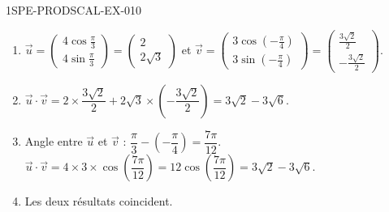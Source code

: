 \begin{corrige}{1SPE-PRODSCAL-EX-010}
\begin{enumerate}
\item $\vec{u} = \begin{pmatrix} 4\cos\frac{\pi}{3} \\ 4\sin\frac{\pi}{3} \end{pmatrix} = \begin{pmatrix} 2 \\ 2\sqrt{3} \end{pmatrix}$ et $\vec{v} = \begin{pmatrix} 3\cos(-\frac{\pi}{4}) \\ 3\sin(-\frac{\pi}{4}) \end{pmatrix} = \begin{pmatrix} \frac{3\sqrt{2}}{2} \\ -\frac{3\sqrt{2}}{2} \end{pmatrix}$.
\item $\vec{u} \cdot \vec{v} = 2 \times \dfrac{3\sqrt{2}}{2} + 2\sqrt{3} \times \left(-\dfrac{3\sqrt{2}}{2}\right) = 3\sqrt{2} - 3\sqrt{6}$.
\item Angle entre $\vec{u}$ et $\vec{v}$ : $\dfrac{\pi}{3} - \left(-\dfrac{\pi}{4}\right) = \dfrac{7\pi}{12}$.
$\vec{u} \cdot \vec{v} = 4 \times 3 \times \cos\!\left(\dfrac{7\pi}{12}\right) = 12\cos\!\left(\dfrac{7\pi}{12}\right) = 3\sqrt{2} - 3\sqrt{6}$.
\item Les deux résultats coincident.
\end{enumerate}
\end{corrige}
